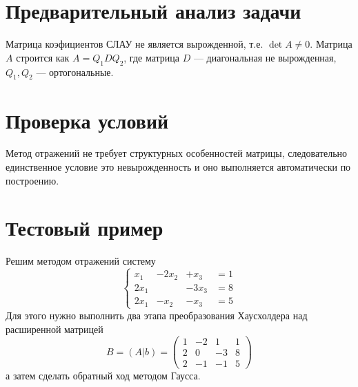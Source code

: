 \documentclass[11pt,a4paper]{article}
\begin{document}
\section{Предварительный анализ задачи}
Матрица коэфициентов СЛАУ не является вырожденной, т.е. $\det{A}\neq 0$. Матрица $A$ строится как $A = Q_{1}DQ_{2}$, где матрица $D$ --- диагональная не вырожденная, $Q_{1},Q_{2}$ --- ортогональные.
\section{Проверка условий}
Метод отражений не требует структурных особенностей матрицы, следовательно единственное условие это невырожденность и оно выполняется автоматически по построению.
\section{Тестовый пример}
Решим методом отражений систему \[ \left\{
\begin{array}{lllc}
  x_{1} &- 2x_{2} &+ x_{3} &= 1\\
  2x_{1} & & -3x_{3} &= 8\\
  2x_{1} &-x_{2} & -x_{3} &= 5
\end{array} \right.
\]
Для этого нужно выполнить два этапа преобразования Хаусхолдера над расширенной матрицей \[
  B = (A|b) = \left(
    \begin{array}{ccc|c}
      1 & -2 & 1 & 1\\
      2 & 0 & -3 & 8\\
      2 & -1 & -1& 5
    \end{array} \right)
\]
а затем сделать обратный ход методом Гаусса.\\
\end{document}
